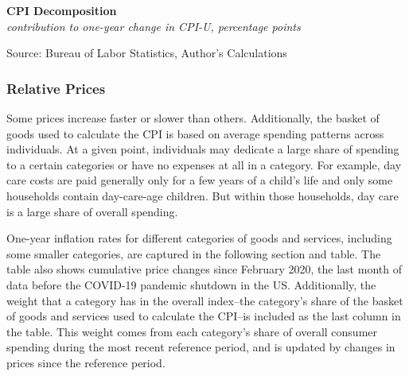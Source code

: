 \documentclass{report}
\makeatletter
\newcommand{\tbllink}[1]{\href{https://raw.githubusercontent.com/bdecon/US-chartbook/master/chartbook/data/#1}{\faTable}}
\newcommand*\short[1]{\expandafter\@gobbletwo\number\numexpr#1\relax}
\newcommand{\ctsbar}[5]{
		\addplot[ybar stacked, bar width=#5, draw opacity=0, fill=#1] 
			table [x=#2, y=#3, col sep=comma]{#4};}
\newcommand{\tydateaxisticks}{
		date coordinates in=x, axis line style={draw=none},
		xmax={2024-01-31}, max space between ticks=40,	    
		xtick={{2011-01-01}, {2012-01-01}, {2013-01-01}, {2014-01-01}, {2015-01-01},
		 {2016-01-01}, {2017-01-01}, {2018-01-01}, {2019-01-01}, {2020-01-01}, 
		 {2021-01-01}, {2022-01-01}, {2023-01-01}, {2024-01-01}},
		enlarge y limits={0.06}, enlarge x limits={0.01},
		}
\newcommand{\bbar}[2]{extra #1 ticks = {{#2}}, extra #1 tick labels = ,
		extra #1 tick style = {grid=major, grid style={thick, black!25}},}
\newcommand{\rbar}{
		\fill[color=black!10] (axis cs:{2020-02-01},\pgfkeysvalueof{/pgfplots/ymin}) 
			rectangle (axis cs:{2020-05-01}, \pgfkeysvalueof{/pgfplots/ymax});}
\makeatother
\begin{document}
{\begin{minipage}{1.0\textwidth}

\vspace{1mm}

\normalsize \textbf{CPI Decomposition}\\
\footnotesize{\textit{contribution to one-year change in CPI-U, percentage points}}
\vspace{4.5cm}

\hspace{2mm} 

\footnotesize{Source: Bureau of Labor Statistics, Author's Calculations} \hfill \tbllink{cpi_decomp.csv}
\vspace{2mm}

\subsubsection*{Relative Prices}
\small Some prices increase faster or slower than others. Additionally, the basket of goods used to calculate the CPI is based on average spending patterns across individuals. At a given point, individuals may dedicate a large share of spending to a certain categories or have no expenses at all in a category. For example, day care costs are paid generally only for a few years of a child's life and only some households contain day-care-age children. But within those households, day care is a large share of overall spending. 

One-year inflation rates for different categories of goods and services, including some smaller categories, are captured in the following section and table. The table also shows cumulative price changes since February 2020, the last month of data before the COVID-19 pandemic shutdown in the US. Additionally, the weight that a category has in the overall index--the category's share of the basket of goods and services used to calculate the CPI--is included as the last column in the table. This weight comes from each category's share of overall consumer spending during the most recent reference period, and is updated by changes in prices since the reference period. 
\end{minipage}
\newpage
\vspace{-6mm}

}
\end{document}
